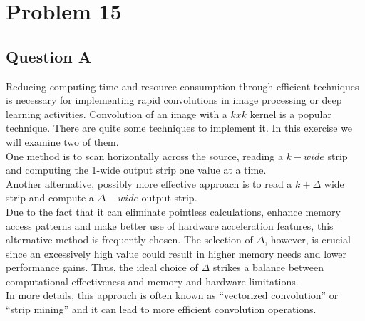 \section{Problem 15}
\subsection{Question A}
Reducing computing time and resource consumption through efficient techniques is necessary for implementing rapid convolutions in image processing or deep learning activities. Convolution of an image with a $k x k$ kernel is a popular technique. There are quite some techniques to implement it. In this exercise we will examine two of them.\\
One method is to scan horizontally across the source, reading a $k-wide$ strip and computing
the 1-wide output strip one value at a time.\\
Another alternative, possibly more effective approach is to read a $k + \Delta$ wide strip
and compute a $\Delta-wide$ output strip. \\
Due to the fact that it can eliminate pointless calculations, enhance memory access patterns and make better use of hardware acceleration features, this alternative method is frequently chosen. The selection of $\Delta$, however, is crucial since an excessively high value could result in higher memory needs and lower performance gains. Thus, the ideal choice of $\Delta$ strikes a balance between computational effectiveness and memory and hardware limitations.
\\

In more details, this approach is often known as “vectorized convolution” or “strip mining” and it can lead to more efficient convolution operations.

